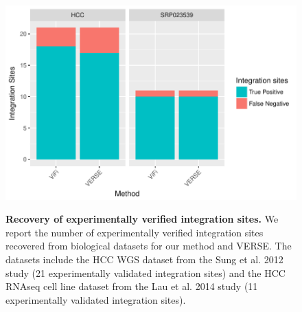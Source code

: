 \documentclass{bioinfo}
\begin{document}
\begin{figure}[htpb]
  \centering
  \includegraphics[width=1\linewidth]{results/hcc.pdf}\\
\caption[Recovery of experimentally verified integration sites from biological datasets.]
{\label{bio_results}  {\bf Recovery of experimentally verified integration sites.}  We report the number of experimentally verified integration sites recovered from biological datasets for our method and VERSE.  The datasets include the HCC WGS dataset from the Sung et al. 2012 study (21 experimentally validated integration sites) and the HCC RNAseq cell line dataset from the Lau et al. 2014 study (11 experimentally validated integration sites).}
\end{figure}
\end{document}
